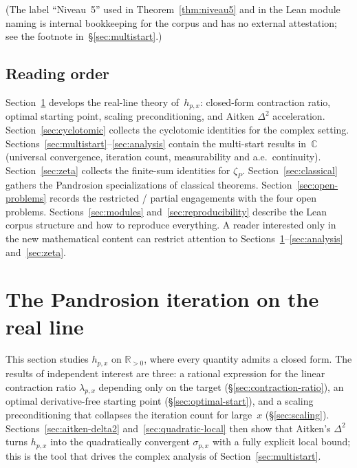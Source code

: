 \documentclass[11pt,a4paper]{article}
\theoremstyle{definition}
\theoremstyle{remark}
\begin{document}
(The label ``Niveau~5'' used in Theorem~\ref{thm:niveau5} and in the
Lean module naming is internal bookkeeping for the corpus and has no
external attestation; see the footnote in~\S\ref{sec:multistart}.)

\subsection{Reading order}

Section~\ref{sec:real-line} develops the real-line theory of~$h_{p,x}$:
closed-form contraction ratio, optimal starting point, scaling
preconditioning, and Aitken $\Delta^2$ acceleration. Section~\ref{sec:cyclotomic}
collects the cyclotomic identities for the complex setting.
Sections~\ref{sec:multistart}--\ref{sec:analysis} contain the multi-start
results in~$\mathbb{C}$ (universal convergence, iteration count,
measurability and a.e.\ continuity). Section~\ref{sec:zeta} collects the
finite-sum identities for $\zeta_P$. Section~\ref{sec:classical} gathers
the Pandrosion specializations of classical theorems.
Section~\ref{sec:open-problems} records the restricted / partial
engagements with the four open problems. Sections~\ref{sec:modules}
and~\ref{sec:reproducibility} describe the Lean corpus structure and
how to reproduce everything. A reader interested only in the new
mathematical content can restrict attention to
Sections~\ref{sec:real-line}--\ref{sec:analysis} and~\ref{sec:zeta}.

\section{The Pandrosion iteration on the real line}
\label{sec:real-line}

This section studies $h_{p,x}$ on $\mathbb{R}_{>0}$, where every
quantity admits a closed form. The results of independent interest are
three: a rational expression for the linear contraction ratio
$\lambda_{p,x}$ depending only on the target (\S\ref{sec:contraction-ratio}),
an optimal derivative-free starting point
(\S\ref{sec:optimal-start}), and a scaling preconditioning that
collapses the iteration count for large~$x$ (\S\ref{sec:scaling}).
Sections~\ref{sec:aitken-delta2} and~\ref{sec:quadratic-local} then
show that Aitken's $\Delta^2$ turns $h_{p,x}$ into the quadratically
convergent $\sigma_{p,x}$ with a fully explicit local bound; this is
the tool that drives the complex analysis of
Section~\ref{sec:multistart}.
\end{document}
